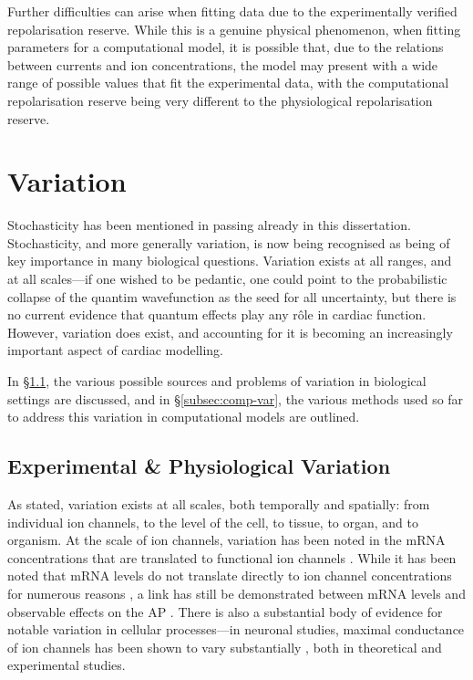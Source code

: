 \documentclass[../thesis-main.tex]{subfiles}
\begin{document}
 Further difficulties can arise when fitting data due to the experimentally verified repolarisation reserve. While this is a genuine physical phenomenon, when fitting parameters for a computational model, it is possible that, due to the relations between currents and ion concentrations, the model may present with a wide range of possible values that fit the experimental data, with the computational repolarisation reserve being very different to the physiological repolarisation reserve.
 
 \section{Variation}
 \label{sec:param-var}
 Stochasticity has been mentioned in passing already in this dissertation. Stochasticity, and more generally variation, is now being recognised as being of key importance in many biological questions. Variation exists at all ranges, and at all scales---if one wished to be pedantic, one could point to the probabilistic collapse of the quantim wavefunction as the seed for all uncertainty, but there is no current evidence that quantum effects play any r\^ole in cardiac function. However, variation does exist, and accounting for it is becoming an increasingly important aspect of cardiac modelling.
 
 In \S\ref{subsec:experimental-var}, the various possible sources and problems of variation in biological settings are discussed, and in \S\ref{subsec:comp-var}, the various methods used so far to address this variation in computational models are outlined.
 
 \subsection{Experimental \& Physiological Variation}
 \label{subsec:experimental-var}
 As stated, variation exists at all scales, both temporally and spatially: from individual ion channels, to the level of the cell, to tissue, to organ, and to organism. At the scale of ion channels, variation has been noted in the mRNA concentrations that are translated to functional ion channels \citep{Gaborit2007}. While it has been noted that mRNA levels do not translate directly to ion channel concentrations for numerous reasons \citep{Edelman2001, Nattel2010}, a link has still be demonstrated between mRNA levels and observable effects on the AP \citep{Walmsley2013}. There is also a substantial body of evidence for notable variation in cellular processes---in neuronal studies, maximal conductance of ion channels has been shown to vary substantially \citep{Marder2011, Goaillard2009, Schulz2006}, both in theoretical and experimental studies.
 
\end{document}
